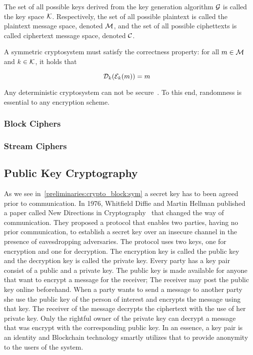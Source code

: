 The set of all possible keys derived from the key generation algorithm $\mathcal{G}$ is called the key space $\mathcal{K}$. Respectively, the set of all possible plaintext is called the plaintext message space, denoted $\mathcal{M}$, and the set of all possible ciphettexts is called ciphertext message space, denoted $\mathcal{C}$.

A symmetric cryptosystem must satisfy the correctness property: for all $m \in \mathcal{M}$ and $k \in \mathcal{K}$, it holds that

\begin{equation*}
  \mathcal{D}_{k}(\mathcal{E}_{k}(m)) = m
\end{equation*}

Any deterministic cryptosystem can not be secure~\cite{Katz:2014:IMC:2700550, kiagias:crypto}. To this end, randomness is essential to any encryption scheme.

\subsubsection{Block Ciphers}
\label{preliminaries:crypto_block:sym:block}

\subsubsection{Stream Ciphers}
\label{preliminaries:crypto_block:sym:stream}

\subsection{Public Key Cryptography}
\label{preliminaries:crypto_block:pub}

As we see in~\ref{preliminaries:crypto_block:sym} a secret key has to been agreed prior to communication. In 1976, Whitfield Diffie and Martin Hellman published a paper called New Directions in Cryptography~\cite{Diffie:2006:NDC:2263321.2269104} that changed the way of communication. They proposed a protocol that enables two parties, having no prior communication, to establish a secret key over an insecure channel in the presence of eavesdropping adversaries. The protocol uses two keys, one for encryption and one for decryption. The encryption key is called the public key and the decryption key is called the private key. Every party has a key pair consist of a public and a private key. The public key is made available for anyone that want to encrypt a message for the receiver; The receiver may post the public key online beforehand. When a party wants to send a message to another party she use the public key of the person of interest and encrypts the message using that key. The receiver of the message decrypts the ciphertext with the use of her private key. Only the rightful owner of the private key can decrypt a message that was encrypt with the corresponding public key. In an essence, a key pair is an identity and Blockchain technology smartly utilizes that to provide anonymity to the users of the system.

